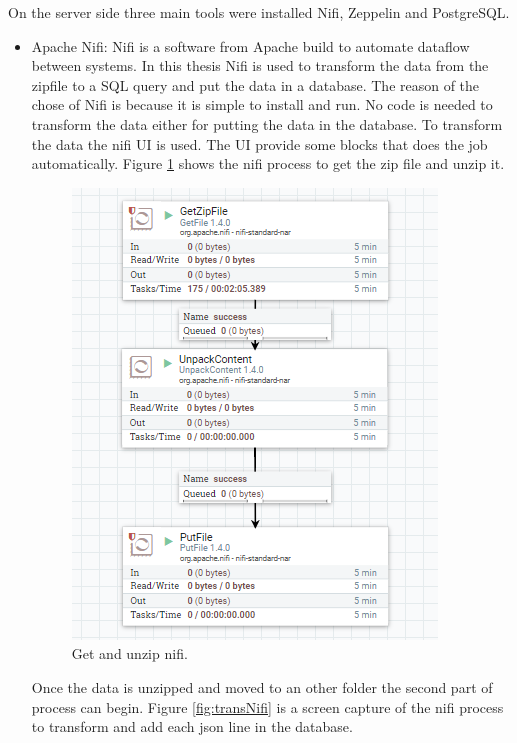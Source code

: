 \documentclass[english]{book_template} %
\begin{document}
On the server side three main tools were installed Nifi, Zeppelin and PostgreSQL. 
\begin{itemize}
\item Apache Nifi: Nifi is a software from Apache build to automate dataflow between systems. In this thesis Nifi is used to transform the data from the zipfile to a SQL query and put the data in a database. The reason of the chose of Nifi is because it is simple to install and run. No code is needed to transform the data either for putting the data in the database. To transform the data the nifi UI is used. The UI provide some blocks that does the job automatically.    %
Figure \ref{fig:zipNifi} shows the nifi process to get the zip file and unzip it.
 
\begin{figure}[H]
\center
\caption{Get and unzip nifi.\label{fig:zipNifi}}
\includegraphics[scale=1]{./img/getzip}
\end{figure} 

Once the data is unzipped and moved to an other folder the second part of process can begin. Figure \ref{fig:transNifi} is a screen capture of the nifi process to transform and add each json line in the database. 


\end{itemize}
\end{document}
